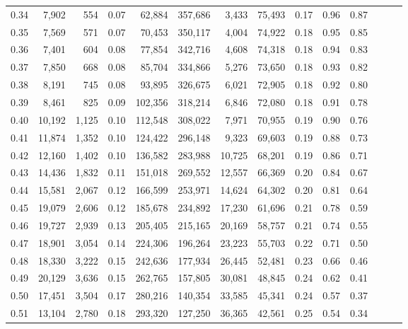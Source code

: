 \begin{tabular}{rrrrrrrrrrrrrr}
0.34 &   7,902 &    554 &  0.07 &   62,884 &  357,686 &   3,433 &  75,493 &  0.17 &  0.96 &      0.87 \\
0.35 &   7,569 &    571 &  0.07 &   70,453 &  350,117 &   4,004 &  74,922 &  0.18 &  0.95 &      0.85 \\
0.36 &   7,401 &    604 &  0.08 &   77,854 &  342,716 &   4,608 &  74,318 &  0.18 &  0.94 &      0.83 \\
0.37 &   7,850 &    668 &  0.08 &   85,704 &  334,866 &   5,276 &  73,650 &  0.18 &  0.93 &      0.82 \\
0.38 &   8,191 &    745 &  0.08 &   93,895 &  326,675 &   6,021 &  72,905 &  0.18 &  0.92 &      0.80 \\
0.39 &   8,461 &    825 &  0.09 &  102,356 &  318,214 &   6,846 &  72,080 &  0.18 &  0.91 &      0.78 \\
0.40 &  10,192 &  1,125 &  0.10 &  112,548 &  308,022 &   7,971 &  70,955 &  0.19 &  0.90 &      0.76 \\
0.41 &  11,874 &  1,352 &  0.10 &  124,422 &  296,148 &   9,323 &  69,603 &  0.19 &  0.88 &      0.73 \\
0.42 &  12,160 &  1,402 &  0.10 &  136,582 &  283,988 &  10,725 &  68,201 &  0.19 &  0.86 &      0.71 \\
0.43 &  14,436 &  1,832 &  0.11 &  151,018 &  269,552 &  12,557 &  66,369 &  0.20 &  0.84 &      0.67 \\
0.44 &  15,581 &  2,067 &  0.12 &  166,599 &  253,971 &  14,624 &  64,302 &  0.20 &  0.81 &      0.64 \\
0.45 &  19,079 &  2,606 &  0.12 &  185,678 &  234,892 &  17,230 &  61,696 &  0.21 &  0.78 &      0.59 \\
0.46 &  19,727 &  2,939 &  0.13 &  205,405 &  215,165 &  20,169 &  58,757 &  0.21 &  0.74 &      0.55 \\
0.47 &  18,901 &  3,054 &  0.14 &  224,306 &  196,264 &  23,223 &  55,703 &  0.22 &  0.71 &      0.50 \\
0.48 &  18,330 &  3,222 &  0.15 &  242,636 &  177,934 &  26,445 &  52,481 &  0.23 &  0.66 &      0.46 \\
0.49 &  20,129 &  3,636 &  0.15 &  262,765 &  157,805 &  30,081 &  48,845 &  0.24 &  0.62 &      0.41 \\
0.50 &  17,451 &  3,504 &  0.17 &  280,216 &  140,354 &  33,585 &  45,341 &  0.24 &  0.57 &      0.37 \\
0.51 &  13,104 &  2,780 &  0.18 &  293,320 &  127,250 &  36,365 &  42,561 &  0.25 &  0.54 &      0.34 \\

\end{tabular}
